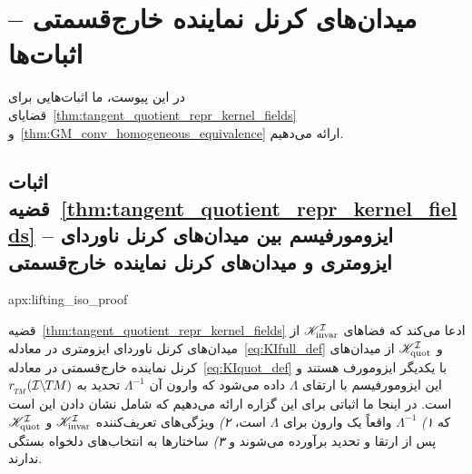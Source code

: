 

\section{میدان‌های کرنل نماینده خارج‌قسمتی -- اثبات‌ها}
\label{apx:lifting_iso_proof}


در این پیوست، ما اثبات‌هایی برای قضایای~\ref{thm:tangent_quotient_repr_kernel_fields} و~\ref{thm:GM_conv_homogeneous_equivalence} ارائه می‌دهیم.


\toclesslab\subsection{اثبات قضیه~\ref{thm:tangent_quotient_repr_kernel_fields} -- ایزومورفیسم بین میدان‌های کرنل ناوردای ایزومتری و میدان‌های کرنل نماینده خارج‌قسمتی}{apx:lifting_iso_proof}


قضیه~\ref{thm:tangent_quotient_repr_kernel_fields} ادعا می‌کند که فضاهای $\mathscr{K}_\textup{invar}^{\mathcal{I}}$ از میدان‌های کرنل ناوردای ایزومتری در معادله~\eqref{eq:KIfull_def} و $\mathscr{K}_\textup{quot}^{\mathcal{I}}$ از میدان‌های کرنل نماینده خارج‌قسمتی در معادله~\eqref{eq:KIquot_def} با یکدیگر ایزومورف هستند و این ایزومورفیسم با ارتقای $\Lambda$ داده می‌شود که وارون آن $\Lambda^{-1}$ تحدید به $\rTM(\ITM)$ است.
در اینجا ما اثباتی برای این گزاره ارائه می‌دهیم که شامل نشان دادن این است که
\textit{۱)} $\Lambda^{-1}$ واقعاً یک وارون برای $\Lambda$ است،
\textit{۲)} ویژگی‌های تعریف‌کننده $\mathscr{K}_\textup{invar}^{\mathcal{I}}$ و $\mathscr{K}_\textup{quot}^{\mathcal{I}}$ پس از ارتقا و تحدید برآورده می‌شوند و
\textit{۳)} ساختارها به انتخاب‌های دلخواه بستگی ندارند.


